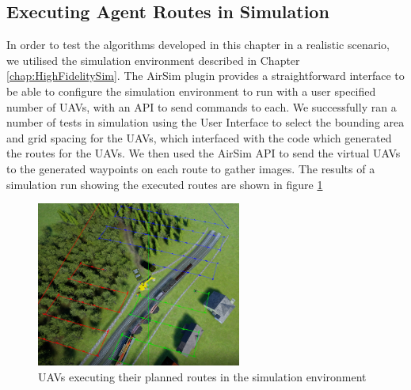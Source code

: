 \subsection{Executing Agent Routes in Simulation}
In order to test the algorithms developed in this chapter in a realistic scenario, we utilised the simulation environment described in Chapter \ref{chap:HighFidelitySim}. The AirSim plugin \cite{Shah2017AirSim:Vehicles} provides a straightforward interface to be able to configure the simulation environment to run with a user specified number of UAVs, with an API to send commands to each. We successfully ran a number of tests in simulation using the User Interface to select the bounding area and grid spacing for the UAVs, which interfaced with the code which generated the routes for the UAVs. We then used the AirSim API to send the virtual UAVs to the generated waypoints on each route to gather images. The results of a simulation run showing the executed routes are shown in figure \ref{fig:VirtualPlannedRoutes}


\begin{figure}
    \centering
    \includegraphics[width=0.6\textwidth]{Chapters/SimulationEnv/Figs/DebuggingLines/RoutesWithRAVsVisible.png}
    \caption{UAVs executing their planned routes in the simulation environment}
    \label{fig:VirtualPlannedRoutes}
\end{figure}